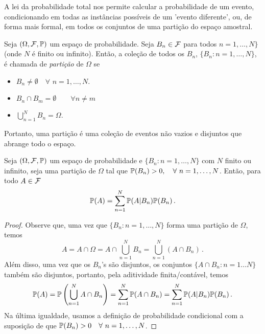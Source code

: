 A lei da probabilidade total nos permite calcular a probabilidade de um evento, condicionando em todas as instâncias possíveis de um 'evento diferente', ou, de forma mais formal, em todos os conjuntos de uma partição do espaço amostral.

\begin{definition}
Seja $(\Omega,\mathcal F,\mathbb{P})$ um espaço de probabilidade. Seja $B_n\in\mathcal F$ para todos $n=1,\dots,N\}$ (onde $N$ é finito ou infinito). Então, a coleção de todos os $B_n$, $\{B_n:n=1,\dots,N\}$, é chamada de \emph{partição} de $\Omega$ se 
\begin{itemize}[noitemsep]
\item $B_n \neq \emptyset \quad \forall \,\, n=1,\dots,N$.
\item $B_n \cap B_m= \emptyset \qquad\forall n \neq m$
\item $\bigcup_{n=1}^{N}B_n=\Omega$.
 \end{itemize}
\end{definition}

Portanto, uma partição é uma coleção de eventos não vazios e disjuntos que abrange todo o espaço.

\begin{proposition}
Seja $(\Omega,\mathcal F,\mathbb{P})$ um espaço de probabilidade e $\{B_n:n=1,\dots,N\}$ com $N$ finito ou infinito, seja uma partição de $\Omega$ tal que $\mathbb{P}(B_n) >0, \quad \forall \,\, n=1,\dots,N$. Então, para todo $A \in \mathcal F$
\begin{equation}
\mathbb{P}(A) = \sum_{n=1}^{N}\mathbb{P}(A|B_n)\mathbb{P}(B_n) \,.
\end{equation}
\end{proposition}

\begin{proof}
Observe que, uma vez que $\{B_n: n=1,\dots,N\}$ forma uma partição de $\Omega$, temos
\begin{equation}
A = A \cap \Omega = A \cap \bigcup_{n=1}^{N}B_n = \bigcup_{n=1}^{N}(A \cap B_n) \,.
\end{equation}
Além disso, uma vez que os $B_n$'s são disjuntos, os conjuntos $\{A \cap B_n: n=1\dots N\}$ também são disjuntos, portanto, pela aditividade finita/contável, temos
\begin{equation}
\mathbb{P}(A) = \mathbb{P}\left(\bigcup_{n=1}^{N}{A \cap B_n}\right) = \sum_{n=1}^{N}\mathbb{P}(A \cap B_n) = \sum_{n=1}^{N}\mathbb{P}(A|B_n)\mathbb{P}(B_n) \,.
\end{equation}
Na última igualdade, usamos a definição de probabilidade condicional com a suposição de que $\mathbb{P}(B_n) >0 \quad \forall \,\, n=1,\dots,N$.
\end{proof}

